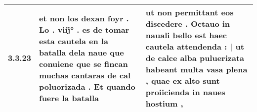 \begin{tabular}{|p{1cm}|p{6.5cm}|p{6.5cm}|}
3.3.23 & et non los dexan foyr . \textbf{ Lo . viij̇° . es de tomar esta cautela en la batalla dela naue que conuiene que se fincan muchas cantaras de cal poluorizada . } Et quando fuere la batalla & ut non permittant eos discedere . \textbf{ Octauo in nauali bello est haec cautela attendenda : | ut de calce alba puluerizata habeant multa vasa plena , } quae ex alto sunt proiicienda in naues hostium , \\\hline

\end{tabular}
